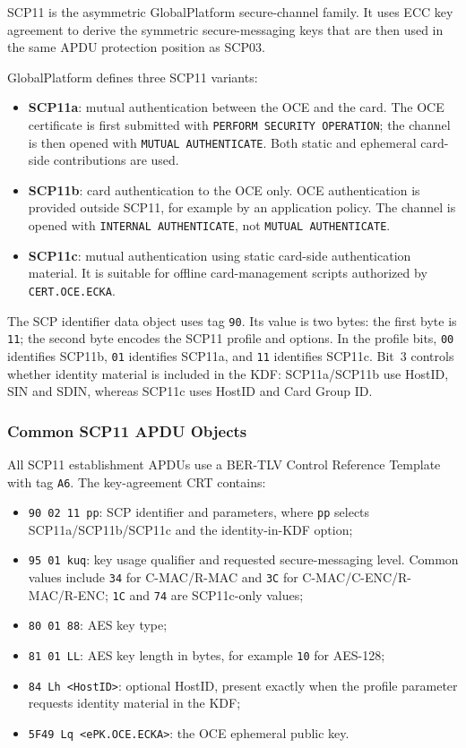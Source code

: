 SCP11 is the asymmetric GlobalPlatform secure-channel family. It uses ECC key
agreement to derive the symmetric secure-messaging keys that are then used in
the same APDU protection position as SCP03.

GlobalPlatform defines three SCP11 variants:
\begin{itemize}
\item \textbf{SCP11a}: mutual authentication between the OCE and the card.
      The OCE certificate is first submitted with
      \texttt{PERFORM SECURITY OPERATION}; the channel is then opened with
      \texttt{MUTUAL AUTHENTICATE}. Both static and ephemeral card-side
      contributions are used.
\item \textbf{SCP11b}: card authentication to the OCE only. OCE
      authentication is provided outside SCP11, for example by an application
      policy. The channel is opened with \texttt{INTERNAL AUTHENTICATE}, not
      \texttt{MUTUAL AUTHENTICATE}.
\item \textbf{SCP11c}: mutual authentication using static card-side
      authentication material. It is suitable for offline card-management
      scripts authorized by \texttt{CERT.OCE.ECKA}.
\end{itemize}

The SCP identifier data object uses tag \texttt{90}. Its value is two bytes:
the first byte is \texttt{11}; the second byte encodes the SCP11 profile and
options. In the profile bits, \texttt{00} identifies SCP11b, \texttt{01}
identifies SCP11a, and \texttt{11} identifies SCP11c. Bit~3 controls whether
identity material is included in the KDF: SCP11a/SCP11b use HostID, SIN and
SDIN, whereas SCP11c uses HostID and Card Group ID.

\subsubsection{Common SCP11 APDU Objects}

All SCP11 establishment APDUs use a BER-TLV Control Reference Template with
tag \texttt{A6}. The key-agreement CRT contains:
\begin{itemize}
\item \texttt{90 02 11 pp}: SCP identifier and parameters, where
      \texttt{pp} selects SCP11a/SCP11b/SCP11c and the identity-in-KDF option;
\item \texttt{95 01 kuq}: key usage qualifier and requested secure-messaging
      level. Common values include \texttt{34} for C-MAC/R-MAC and
      \texttt{3C} for C-MAC/C-ENC/R-MAC/R-ENC; \texttt{1C} and \texttt{74}
      are SCP11c-only values;
\item \texttt{80 01 88}: AES key type;
\item \texttt{81 01 LL}: AES key length in bytes, for example
      \texttt{10} for AES-128;
\item \texttt{84 Lh <HostID>}: optional HostID, present exactly when the
      profile parameter requests identity material in the KDF;
\item \texttt{5F49 Lq <ePK.OCE.ECKA>}: the OCE ephemeral public key.
\end{itemize}

